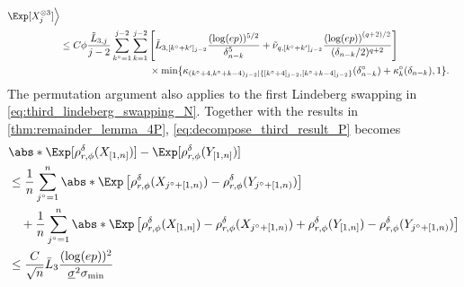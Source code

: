 \documentclass[aos]{imsart}
\begin{document}
\begin{appendix}
\begin{equation*}
\begin{aligned}
        \Exp[X_j^{\otimes 3}] \Big\rangle \\
    & \leq C \phi \frac{\tilde L_{3,j}}{j-2} \sum_{k^\circ=1}^{j-2} \sum_{k=1}^{j-2} \left[ 
        \tilde L_{3,[k^\circ+k']_{j-2}} \frac{(\log(ep))^{5/2}}{\delta_{n-k}^5}
        + \tilde \nu_{q,[k^\circ+k']_{j-2}} \frac{ {(\log(ep))}^{(q+2)/2}}{(\delta_{n-k}/2)^{q+2}}
    \right] \\
    & \quad \hspace{1.1in} \times \min\{\kappa_{(k^\circ+4,k^\circ+k-4)_{j-2}|\{[k^\circ+4]_{j-2},[k^\circ+k-4]_{j-2}\}}(\delta_{n-k}^\circ) + \kappa^\circ_{k}(\delta_{n-k}), 1\}. \\
\end{aligned}
\end{equation*}
The permutation argument also applies to the first Lindeberg swapping in \cref{eq:third_lindeberg_swapping_N}. Together with the results in \cref{thm:remainder_lemma_4P}, \cref{eq:decompose_third_result_P} becomes
\begin{equation*}
\begin{aligned}
    & \abs*{ \Exp[\rho_{r,\phi}^\delta(X_{[1,n]})] - \Exp[\rho_{r,\phi}^\delta(Y_{[1,n]})]} \\
    & \leq \frac{1}{n} \sum_{j^\circ=1}^n \abs*{ \Exp\left[
        \rho_{r,\phi}^\delta(X_{j^\circ+[1,n)}) - \rho_{r,\phi}^\delta(Y_{j^\circ+[1,n)})
    \right]} \\
    & \quad + \frac{1}{n} \sum_{j^\circ=1}^n \abs*{ \Exp\left[ \rho_{r,\phi}^\delta(X_{[1,n]}) - \rho_{r,\phi}^\delta(X_{j^\circ+[1,n)}) + \rho_{r,\phi}^\delta(Y_{[1,n]}) - \rho_{r,\phi}^\delta(Y_{j^\circ+[1,n)})\right]} \\
    & \leq \frac{C}{\sqrt{n}} \bar{L}_{3} \frac{(\log(ep))^2}{\underline{\sigma}^2 \sigma_{\min}} \\

\end{aligned}
\end{equation*}
\end{appendix}
\end{document}
